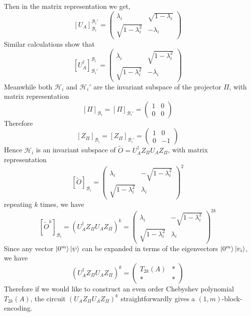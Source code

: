 \documentclass[12pt, oneside]{book}
\theoremstyle{definition}
\theoremstyle{definition}
\theoremstyle{remark}
\begin{document}
Then in the matrix representation we get,
\[
[U_A]_{\mathcal{B}_i}^{\mathcal{B}_i'} = \begin{pmatrix} \lambda_i & \sqrt{1-\lambda_i} \\ \sqrt{1-\lambda_i^2} & -\lambda_i \end{pmatrix}
\]
Similar calculations show that
\[
[U_A^{\dagger}]_{\mathcal{B}_i'}^{\mathcal{B}_i} = \begin{pmatrix} \lambda_i & \sqrt{1-\lambda_i^2} \\ \sqrt{1-\lambda_i^2} & -\lambda_i \end{pmatrix}
\]
Meanwhile both $\mathcal{H}_i$ and $\mathcal{H}_i'$ are the invariant subspace of the projector $\Pi$, with matrix representation
\[
[\Pi]_{\mathcal{B}_i} = [\Pi]_{\mathcal{B}_i'} = \begin{pmatrix} 1 & 0 \\ 0 & 0 \end{pmatrix} 
\]
Therefore
\[
[Z_{\Pi}]_{\mathcal{B}_i}= [Z_{\Pi}]_{\mathcal{B}_i'} = \begin{pmatrix} 1 & 0 \\ 0 & -1 \end{pmatrix}
\]
Hence $\mathcal{H}_i$ is an invariant subspace of $\tilde{O}=U_A^{\dagger}Z_{\Pi}U_AZ_{\Pi}$, with matrix representation
\[
[\tilde{O}]_{\mathcal{B}_i} = \begin{pmatrix} \lambda_i & -\sqrt{1-\lambda_i^2} \\ \sqrt{1-\lambda_i^2} & \lambda_i \end{pmatrix}^2
\]
repeating $k$ times, we have
\[
[\tilde{O}^k]_{\mathcal{B}_i} = (U_A^{\dagger}Z_{\Pi}U_AZ_{\Pi})^k = \begin{pmatrix} \lambda_i & -\sqrt{1-\lambda_i^2} \\ \sqrt{1-\lambda_i^2} & \lambda_i \end{pmatrix}^{2k}
\]
Since any vector $\ket{0^m}\ket{\psi}$ can be expanded in terms of the eigenvectors $\ket{0^m}\ket{v_i}$, we have
\[
(U_A^{\dagger}Z_{\Pi}U_AZ_{\Pi})^k = \begin{pmatrix} T_{2k}(A) & * \\ * & * \end{pmatrix}
\]
Therefore if we would like to construct an even order Chebyshev polynomial $T_{2k}(A)$, the circuit $(U_AZ_{\Pi}U_AZ_{\Pi})^k$ straightforwardly gives a $(1,m)$-block-encoding.
\end{document}
